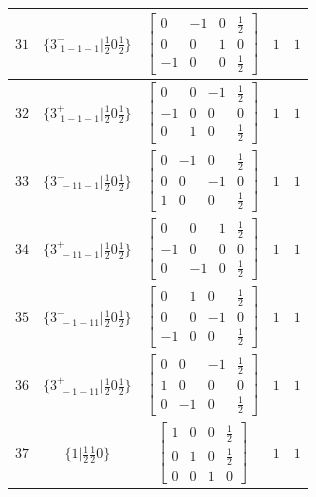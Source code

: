 \documentclass[fleqn,8pt]{jsarticle}
\begin{document}
\begin{longtable}{ccccc}
$ 31 $ & $ \{3^{-}_{\,\,1-1-1}|\frac{1}{2} 0 \frac{1}{2}\} $ & $ \begin{bmatrix} 0 & -1 & 0 & \frac{1}{2} \\ 0 & 0 & 1 & 0 \\ -1 & 0 & 0 & \frac{1}{2} \end{bmatrix} $ & $ 1 $ & $ 1 $ \\ \hline
$ 32 $ & $ \{3^{+}_{\,\,1-1-1}|\frac{1}{2} 0 \frac{1}{2}\} $ & $ \begin{bmatrix} 0 & 0 & -1 & \frac{1}{2} \\ -1 & 0 & 0 & 0 \\ 0 & 1 & 0 & \frac{1}{2} \end{bmatrix} $ & $ 1 $ & $ 1 $ \\ \hline
$ 33 $ & $ \{3^{-}_{\,\,-11-1}|\frac{1}{2} 0 \frac{1}{2}\} $ & $ \begin{bmatrix} 0 & -1 & 0 & \frac{1}{2} \\ 0 & 0 & -1 & 0 \\ 1 & 0 & 0 & \frac{1}{2} \end{bmatrix} $ & $ 1 $ & $ 1 $ \\ \hline
$ 34 $ & $ \{3^{+}_{\,\,-11-1}|\frac{1}{2} 0 \frac{1}{2}\} $ & $ \begin{bmatrix} 0 & 0 & 1 & \frac{1}{2} \\ -1 & 0 & 0 & 0 \\ 0 & -1 & 0 & \frac{1}{2} \end{bmatrix} $ & $ 1 $ & $ 1 $ \\ \hline
$ 35 $ & $ \{3^{-}_{\,\,-1-11}|\frac{1}{2} 0 \frac{1}{2}\} $ & $ \begin{bmatrix} 0 & 1 & 0 & \frac{1}{2} \\ 0 & 0 & -1 & 0 \\ -1 & 0 & 0 & \frac{1}{2} \end{bmatrix} $ & $ 1 $ & $ 1 $ \\ \hline
$ 36 $ & $ \{3^{+}_{\,\,-1-11}|\frac{1}{2} 0 \frac{1}{2}\} $ & $ \begin{bmatrix} 0 & 0 & -1 & \frac{1}{2} \\ 1 & 0 & 0 & 0 \\ 0 & -1 & 0 & \frac{1}{2} \end{bmatrix} $ & $ 1 $ & $ 1 $ \\ \hline
$ 37 $ & $ \{1|\frac{1}{2} \frac{1}{2} 0\} $ & $ \begin{bmatrix} 1 & 0 & 0 & \frac{1}{2} \\ 0 & 1 & 0 & \frac{1}{2} \\ 0 & 0 & 1 & 0 \end{bmatrix} $ & $ 1 $ & $ 1 $ \\ \hline

\end{longtable}
\end{document}
